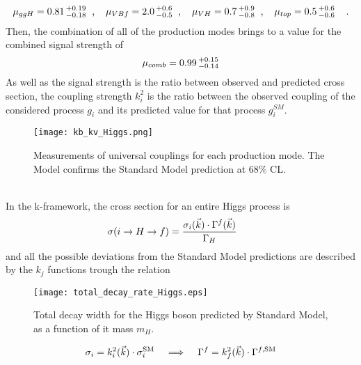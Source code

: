 \begin{equation}
\mu_{ggH} = 0.81\hspace{0.06cm}^{+0.19}_{-0.18}\hspace{0.2cm} \text{,} \hspace{0.4cm} \mu_{VBf} = 2.0\hspace{0.06cm}^{+0.6}_{-0.5} \hspace{0.2cm} \text{,} \hspace{0.4cm} \mu_{VH} = 0.7\hspace{0.06cm}^{+0.9}_{-0.8} \hspace{0.2cm} \text{,} \hspace{0.4cm} \mu_{top} = 0.5\hspace{0.06cm}^{+0.6}_{-0.6} \hspace{0.4cm} \text{.}
\end{equation}
Then, the combination of all of the production modes brings to a value for the combined signal strength of
\begin{equation}
\mu_{comb} = 0.99\hspace{0.06cm}^{+0.15}_{-0.14}
\end{equation}
As well as the signal strength is the ratio between observed and predicted cross section, the coupling strength $k_i^2$ is the ratio between the observed coupling of the considered process $g_i$ and its predicted value for that process $g_i^{SM}$.
\begin{figure}[!b]
\centering
\texttt{[image: kb\_kv\_Higgs.png]}
\caption{Measurements of universal couplings for each production mode. The Model confirms the Standard Model prediction at 68\% CL.}
\end{figure}
\\In the k-framework, the cross section for an entire Higgs process is
\begin{equation}
\sigma(i \rightarrow H \rightarrow f) = \frac{\sigma_i(\vec{k}) \cdot \Gamma^f(\vec{k})}{\Gamma_H} \hspace{0.6cm}
\end{equation}
and all the possible deviations from the Standard Model predictions are described by the $k_j$ functions trough the relation
\begin{figure}[htb]
\centering
\texttt{[image: total\_decay\_rate\_Higgs.eps]}
\caption{Total decay width for the Higgs boson predicted by Standard Model, as a function of it mass $m_H$.}
\label{total_decay_rate}
\end{figure}
\phantom{i}
\begin{equation}
\sigma_i = k_i^2(\vec{k}) \cdot \sigma_i^{\text{SM}} \hspace{0.4cm} \Longrightarrow \hspace{0.4cm} \Gamma^f = k_f^2(\vec{k}) \cdot \Gamma^{f, \text{SM}}
\end{equation}
